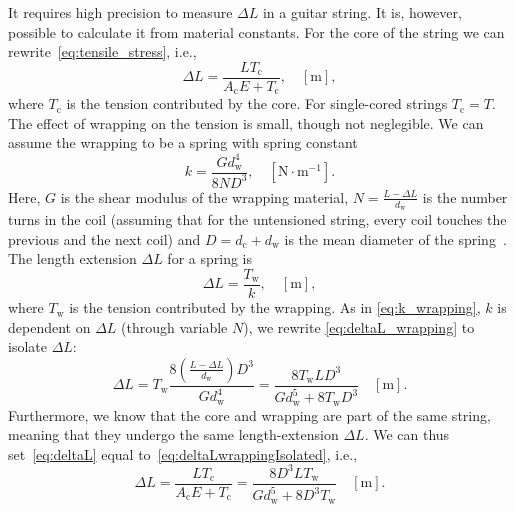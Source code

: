 \documentclass{article}
\begin{document}
\begin{sloppy}
It requires high precision to measure $\Delta L$ in a guitar string. It is, however, possible to calculate it from material constants. For the core of the string we can rewrite~\eqref{eq:tensile_stress}, i.e.,
%
\begin{equation}\label{eq:deltaL}
    \Delta L= \frac{LT_\text{c}}{A_\text{c}E + T_\text{c}}, \quad  [\text{m}], 
\end{equation}
%
where $T_\text{c}$ is the tension contributed by the core. For single-cored strings $T_\text{c} = T$.
%
The effect of wrapping on the tension is small, though not neglegible. We can assume the wrapping to be a spring with spring constant~\cite{childs:mechanical_engineering}
%
\begin{equation}\label{eq:k_wrapping}
    k = \frac{Gd_\text{w}^4}{8ND^3}, \quad [\text{N}\cdot\text{m}^{-1}].
\end{equation}
%
Here, $G$ is the shear modulus of the wrapping material, $N = \frac{L - \Delta L}{d_\text{w}}$ is the number turns in the coil (assuming that for the untensioned string, every coil touches the previous and the next coil) and $D = d_\text{c}+d_\text{w}$ is the mean diameter of the spring~\cite{kemp:wound_and_unwound_strings}.
%
The length extension $\Delta L$ for a spring is
%
\begin{equation}\label{eq:deltaL_wrapping}
    \Delta L = \frac{T_\text{w}}{k}, \quad [\text{m}],
\end{equation}
%
where $T_\text{w}$ is the tension contributed by the wrapping. As in \eqref{eq:k_wrapping}, $k$ is dependent on $\Delta L$ (through variable $N$), we rewrite  \eqref{eq:deltaL_wrapping} to isolate $\Delta L$:
\begin{equation}\label{eq:deltaLwrappingIsolated}
    \Delta L = T_\text{w}\frac{8(\frac{L - \Delta L}{d_\text{w}})D^3}{Gd_\text{w}^4} = \frac{8T_\text{w}LD^3}{Gd_\text{w}^5 + 8T_\text{w}D^3} \quad [\text{m}].
\end{equation}
Furthermore, we know that the core and wrapping are part of the same string, meaning that they undergo the same length-extension $\Delta L$. We can thus set~\eqref{eq:deltaL} equal to~\eqref{eq:deltaLwrappingIsolated}, i.e., 
%
\begin{equation}
    \Delta L = \frac{LT_\text{c}}{A_\text{c}E + T_\text{c}} = \frac{8D^3LT_\text{w}}{Gd_\text{w}^5 + 8D^3T_\text{w}} \quad [\text{m}].

\end{equation}
\end{sloppy}
\end{document}

